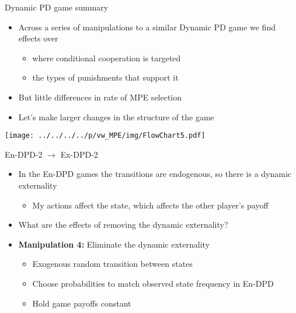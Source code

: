 \documentclass{beamer}
\begin{document}
\begin{frame}{Dynamic PD game summary}
\begin{itemize}
\item Across a series of manipulations to a similar Dynamic PD game we find
effects over

\begin{itemize}
\item where conditional cooperation is targeted
\item the types of punishments that support it
\end{itemize}
\item But little differences in rate of MPE selection
\item Let's make larger changes in the structure of the game
\end{itemize}
\end{frame}
\begin{frame}


\begin{center}\texttt{[image: ../../../../p/vw\_MPE/img/FlowChart5.pdf]}
\end{center}
\end{frame}


\begin{frame}{En-DPD-2 $\rightarrow$ Ex-DPD-2}
\begin{itemize}
\item In the En-DPD games the transitions are endogenous, so there is a
dynamic externality

\begin{itemize}
\item My actions affect the state, which affects the other player's payoff
\end{itemize}
\item What are the effects of removing the dynamic externality?\pause
\item \textbf{Manipulation 4:} Eliminate the dynamic externality

\begin{itemize}
\item Exogenous random transition between states
\item Choose probabilities to match observed state frequency in En-DPD
\item Hold game payoffs constant
\end{itemize}
\end{itemize}
\end{frame}
\end{document}
